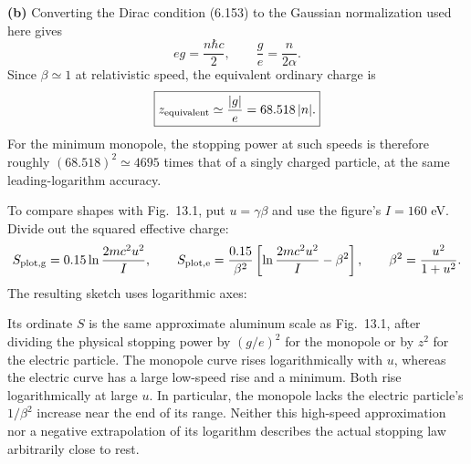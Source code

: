 \textbf{(b)} Converting the Dirac condition (6.153) to the Gaussian
normalization used here gives
\[
 eg=\frac{n\hbar c}{2},\qquad
 \frac ge=\frac{n}{2\alpha}.
\]
Since $\beta\simeq1$ at relativistic speed, the equivalent ordinary
charge is
\[
 \boxed{z_{\rm equivalent}\simeq\frac{|g|}{e}
       =68.518\,|n|.}
\]
For the minimum monopole, the stopping power at such speeds is therefore
roughly $(68.518)^2\simeq4695$ times that of a singly charged particle,
at the same leading-logarithm accuracy.

To compare shapes with Fig.~13.1, put $u=\gamma\beta$ and use the
figure's $I=160$ eV. Divide out the squared effective charge:
\[
 S_{\rm plot,g}=0.15\ln\frac{2mc^2u^2}{I},\qquad
 S_{\rm plot,e}=\frac{0.15}{\beta^2}
       \left[\ln\frac{2mc^2u^2}{I}-\beta^2\right],
 \qquad \beta^2=\frac{u^2}{1+u^2}.
\]
The resulting sketch uses logarithmic axes:
\begin{center}

\end{center}
Its ordinate $S$ is the same approximate aluminum scale as Fig.~13.1,
after dividing the physical stopping power by $(g/e)^2$ for the
monopole or by $z^2$ for the electric particle. The monopole curve
rises logarithmically with $u$, whereas the electric curve has a
large low-speed rise and a minimum. Both rise logarithmically at
large $u$. In particular, the monopole lacks the electric particle's
$1/\beta^2$ increase near the end of its range. Neither this
high-speed approximation nor a negative extrapolation of its logarithm
describes the actual stopping law arbitrarily close to rest.





